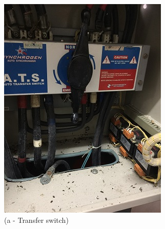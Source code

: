 \begin{figure}
	\begin{minipage}[b]{0.22\linewidth}
		\centering
		\includegraphics[width=\textwidth]{figures/asv_visual_automatic_transfer_switch}
		\caption*{(a - Transfer switch)}
	\end{minipage}
	\hspace{0.03cm}
	\begin{minipage}[b]{0.22\linewidth}
		\centering

\end{minipage}
\end{figure}
